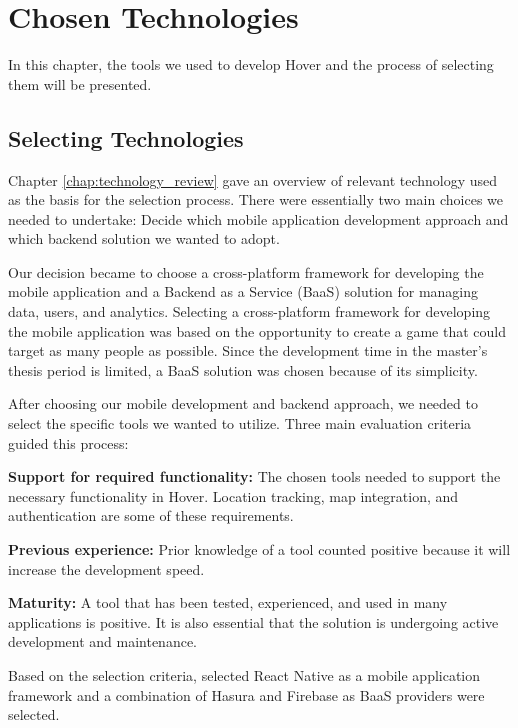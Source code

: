 \section{Chosen Technologies}
\label{chap:chosen_technologies}
In this chapter, the tools we used to develop Hover and the process of selecting them will be presented.

\subsection{Selecting Technologies}
Chapter \ref{chap:technology_review} gave an overview of relevant technology used as the basis for the selection process. There were essentially two main choices we needed to undertake: Decide which mobile application development approach and which backend solution we wanted to adopt.

Our decision became to choose a cross-platform framework for developing the mobile application and a Backend as a Service (BaaS) solution for managing data, users, and analytics. Selecting a cross-platform framework for developing the mobile application was based on the opportunity to create a game that could target as many people as possible. Since the development time in the master’s thesis period is limited, a BaaS solution was chosen because of its simplicity.

After choosing our mobile development and backend approach, we needed to select the specific tools we wanted to utilize. Three main evaluation criteria guided this process:

\textbf{Support for required functionality:} The chosen tools needed to support the necessary functionality in Hover. Location tracking, map integration, and authentication are some of these requirements.

\textbf{Previous experience:} Prior knowledge of a tool counted positive because it will increase the development speed. 

\textbf{Maturity:} A tool that has been tested, experienced, and used in many applications is positive. It is also essential that the solution is undergoing active development and maintenance.

Based on the selection criteria, selected React Native as a mobile application framework and a combination of Hasura and Firebase as BaaS providers were selected. 

